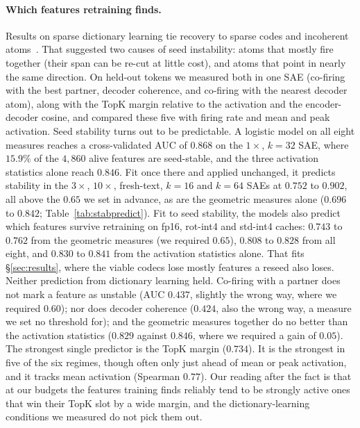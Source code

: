 \documentclass{article}
\begin{document}
\paragraph{Which features retraining finds.} Results on sparse
dictionary learning tie recovery to sparse codes and incoherent
atoms~\citep{sww,agm}. That suggested two causes of seed instability:
atoms that mostly fire together (their span can be re-cut at little
cost), and atoms that point in nearly the same direction. On held-out
tokens we measured both in one SAE (co-firing with the best partner,
decoder coherence, and co-firing with the nearest decoder atom), along
with the TopK margin relative to the activation and the encoder-decoder
cosine, and compared these five with firing rate and mean and peak
activation. Seed stability turns out to be
predictable. A logistic model on all eight measures reaches a
cross-validated AUC of $0.868$ on the $1\times$, $k=32$ SAE, where
$15.9\%$ of the $4{,}860$ alive features are seed-stable, and the three
activation statistics alone reach $0.846$. Fit once there
and applied unchanged, it predicts stability in the $3\times$,
$10\times$, fresh-text, $k=16$ and $k=64$ SAEs at $0.752$ to $0.902$, all
above the $0.65$ we set in advance, as are the geometric measures alone
($0.696$ to $0.842$; Table~\ref{tab:stabpredict}). Fit to seed
stability, the models also predict which features survive retraining on
fp16, rot-int4 and std-int4 caches: $0.743$ to $0.762$ from the
geometric measures (we required $0.65$), $0.808$ to $0.828$ from all
eight, and $0.830$ to $0.841$ from the activation statistics alone. That fits \S\ref{sec:results}, where the viable
codecs lose mostly features a reseed also loses. Neither prediction
from dictionary learning held. Co-firing with a partner does not mark a
feature as unstable (AUC $0.437$, slightly the wrong way, where we
required $0.60$); nor does decoder coherence ($0.424$, also the wrong
way, a measure we set no threshold for); and the geometric measures
together do no better than the activation statistics ($0.829$ against
$0.846$, where we required a gain of $0.05$). The strongest single
predictor is the TopK margin ($0.734$). It is the strongest in five of
the six regimes, though often only just ahead of mean or peak
activation, and it tracks mean activation (Spearman $0.77$). Our
reading after the fact is that at our budgets the features training
finds reliably tend to be strongly active ones that win their TopK slot
by a wide margin, and the dictionary-learning conditions we measured do
not pick them out.
\end{document}
